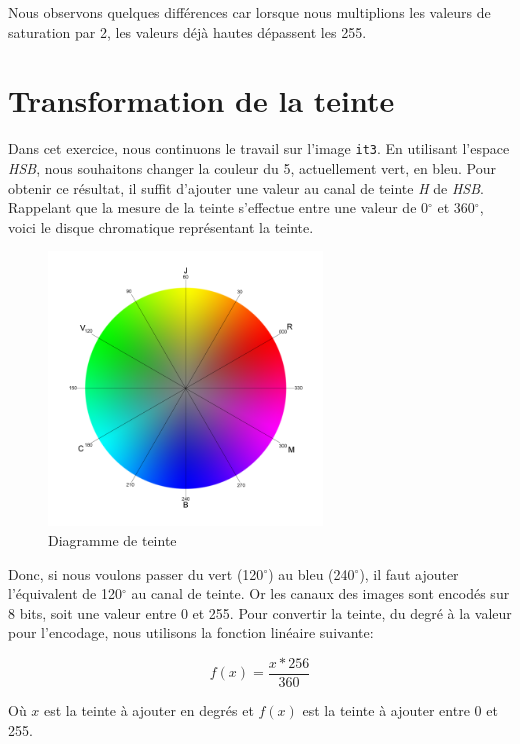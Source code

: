 \documentclass[a4paper,11pt]{article}
\begin{document}
Nous observons quelques différences car lorsque nous multiplions les 
valeurs de saturation par 2, les valeurs déjà hautes dépassent les 255.

\section{Transformation de la teinte}

Dans cet exercice, nous continuons le travail sur l'image \texttt{it3}. 
En utilisant l'espace \textit{HSB}, nous souhaitons changer la couleur 
du 5, actuellement vert, en bleu. Pour obtenir ce résultat, il suffit 
d'ajouter une valeur au canal de teinte \textit{H} de \textit{HSB}. 
Rappelant que la mesure de la teinte s'effectue entre une valeur de 
0$^{\circ}$ et 360$^{\circ}$, voici le disque chromatique représentant la teinte.\\

\begin{figure}[H]
  \begin{center}
    \includegraphics[width=275px]{images/disque_chr.png}
    \caption{Diagramme de teinte}
  \end{center}
\end{figure}

Donc, si nous voulons passer du vert (120$^{\circ}$) au bleu 
(240$^{\circ}$), il faut ajouter l'équivalent de 120$^{\circ}$ au 
canal de teinte. Or les canaux des images sont encodés sur 8 bits, 
soit une valeur entre 0 et 255. Pour convertir la teinte, du degré à la 
valeur pour l'encodage, nous utilisons la fonction linéaire suivante:

\[ f(x) = \frac{x*256}{360} \]

Où $x$ est la teinte à ajouter en degrés et $f(x)$ est la teinte à 
ajouter entre 0 et 255.
\end{document}

